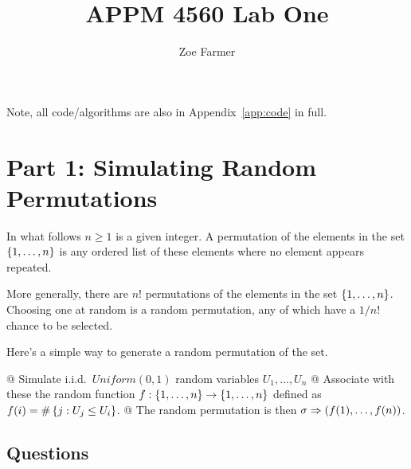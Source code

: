 \documentclass[11pt]{article}
\title{APPM 4560 Lab One}
\author{Zoe Farmer}
\begin{document}
\maketitle

Note, all code/algorithms are also in Appendix~\ref{app:code} in full.

\section{Part 1: Simulating Random Permutations}

In what follows $n \ge 1$ is a given integer. A permutation of the elements in
the set $\left\{ 1, \ldots, n \right\}$ is any ordered list of these elements where no
element appears repeated.

More generally, there are $n!$ permutations of the elements in the set $\left\{ 1,
\ldots, n \right\}$. Choosing one at random is a random permutation, any of which have a
$1 / n!$ chance to be selected.

Here's a simple way to generate a random permutation of the set.

\begin{easylist}[itemize]
    @ Simulate i.i.d.\ $Uniform(0, 1)$ random variables $U_1, \ldots, U_n$
    @ Associate with these the random function $f: \left\{ 1, \ldots, n \right\} \to
    \left\{ 1, \ldots, n \right\}$ defined as $f(i) = \#\left\{ j: U_j \le U_i \right\}$.
    @ The random permutation is then $\sigma \Rightarrow \left( f(1), \ldots,
    f(n) \right)$.
\end{easylist}

    \subsection{Questions}
\end{document}
